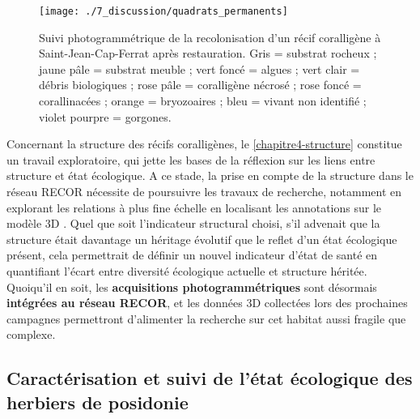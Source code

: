 \begin{figure}[H]
	\begin{center}
	\texttt{[image: ./7\_discussion/quadrats\_permanents]}
		\caption[Suivi photogrammétrique de la recolonisation d’un récif coralligène à Saint-Jean-Cap-Ferrat après restauration]{Suivi photogrammétrique de la recolonisation d’un récif coralligène à Saint-Jean-Cap-Ferrat après restauration. Gris = substrat rocheux ; jaune pâle = substrat meuble ; vert foncé = algues ; vert clair = débris biologiques ; rose pâle = coralligène nécrosé ; rose foncé = corallinacées ; orange = bryozoaires ; bleu = vivant non identifié ; violet pourpre = gorgones.}
	\label{figure_discussion3}
\end{center}
\end{figure}

Concernant la structure des récifs coralligènes, le \autoref{chapitre4-structure} constitue un travail exploratoire, qui jette les bases de la réflexion sur les liens entre structure et état écologique. A ce stade, la prise en compte de la structure dans le réseau RECOR nécessite de poursuivre les travaux de recherche, notamment en explorant les relations à plus fine échelle en localisant les annotations sur le modèle 3D \citep{price_using_2019}. Quel que soit l’indicateur structural choisi, s’il advenait que la structure était davantage un héritage évolutif que le reflet d’un état écologique présent, cela permettrait de définir un nouvel indicateur d’état de santé en quantifiant l’écart entre diversité écologique actuelle et structure héritée. Quoiqu’il en soit, les \textbf{acquisitions photogrammétriques} sont désormais \textbf{intégrées au réseau RECOR}, et les données 3D collectées lors des prochaines campagnes permettront d’alimenter la recherche sur cet habitat aussi fragile que complexe.

\subsection{Caractérisation et suivi de l’état écologique des herbiers de posidonie}

